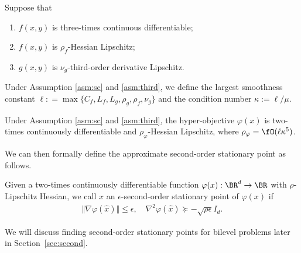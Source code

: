 \documentclass{article}
\begin{document}

\begin{asm} \label{asm:third}
Suppose that
\begin{enumerate}[label=\alph*.]
    \item $f(x,y)$ is three-times continuous differentiable;
    \item $f(x,y)$ is $\rho_f$-Hessian Lipschitz;
    \item  $ g(x,y)$ is $\nu_g$-third-order derivative Lipschitz.
\end{enumerate}
\end{asm}

\begin{dfn} \label{dfn:kappa-third}
Under Assumption \ref{asm:sc} and \ref{asm:third}, we define the largest smoothness constant $\ell: =\max \{ C_f,L_f,L_g,\rho_g,\rho_f,\nu_g  \}$ and the condition number 
$\kappa:= \ell / \mu$. 
\end{dfn}

\begin{prop} \label{prop:Hess-smooth}
    Under Assumption \ref{asm:sc} and \ref{asm:third}, the hyper-objective $\varphi(x)$ is two-times continuously differentiable and $\rho_\varphi$-Hessian Lipschitz, where $\rho_\varphi = \fO(\ell \kappa^5)$.
\end{prop}

We can then formally define the
 approximate second-order stationary point as follows.
\begin{dfn} \label{dfn:sta-hyper-second}
Given a two-times continuously differentiable function $\varphi(x): \BR^d \rightarrow \BR $ with $\rho$-Lipschitz Hessian,
we call $\hat x$ an $\epsilon$-second-order stationary point of $\varphi(x)$ if 
\begin{align*}
    \Vert \nabla \varphi(\hat x) \Vert \le \epsilon,\quad  \nabla^2 \varphi(\hat x)  \succeq -\sqrt{\rho \epsilon}  I_{d}.
\end{align*}
\end{dfn}
We will discuss finding second-order stationary points for bilevel problems later in Section~\ref{sec:second}.
\end{document}
